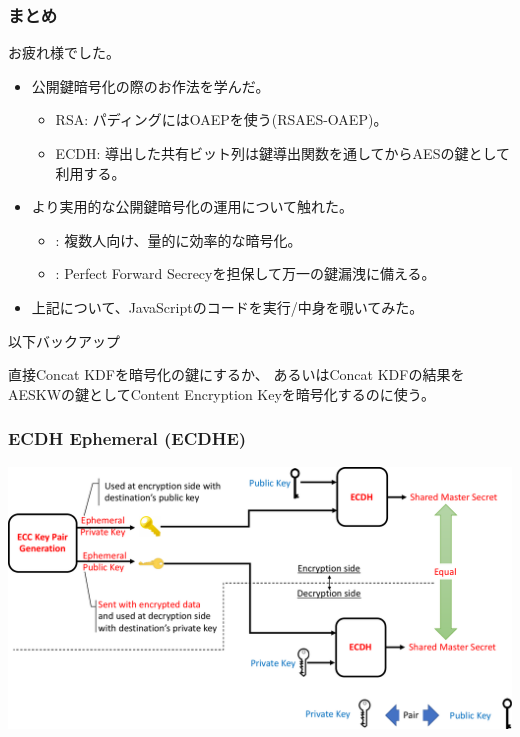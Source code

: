 \documentclass[12pt,dvipdfmx]{beamer}
\begin{document}
\begin{frame}
\frametitle{まとめ}
お疲れ様でした。

\begin{itemize}
\item 公開鍵暗号化の際のお作法を学んだ。
\begin{itemize}
 \item RSA: パディングには\alert{OAEPを使う(RSAES-OAEP)}。
 \item ECDH: 導出した共有ビット列は\alert{鍵導出関数を通してから}AESの鍵として利用する。
\end{itemize}
\item より実用的な公開鍵暗号化の運用について触れた。
\begin{itemize}
 \item {}: 複数人向け、量的に効率的な暗号化。
 \item {}: Perfect Forward Secrecyを担保して万一の鍵漏洩に備える。
\end{itemize}
\item 上記について、JavaScriptのコードを実行/中身を覗いてみた。
\end{itemize}
\end{frame}

\begin{frame}
 以下バックアップ
\end{frame}
\begin{frame}
直接Concat KDFを暗号化の鍵にするか、
あるいはConcat KDFの結果をAESKWの鍵としてContent Encryption Keyを暗号化するのに使う。

\end{frame}

\begin{frame}
\frametitle{ECDH Ephemeral (ECDHE)}
\begin{center}
\includegraphics[width=\linewidth]{Figs/ecdh01.pdf}
\end{center}
\end{frame}
\end{document}
